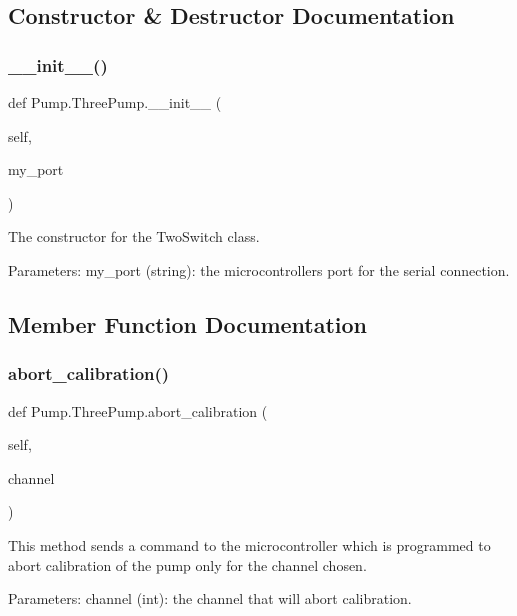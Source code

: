 \subsection{Constructor \& Destructor Documentation}
\mbox{\label{class_pump_1_1_three_pump_a5b920fdc4f8e16fb17dee7ca99586bf9}} 
\subsubsection{\texorpdfstring{\_\_init\_\_()}{\_\_init\_\_()}}
{\footnotesize\ttfamily def Pump.\+Three\+Pump.\+\_\+\+\_\+init\+\_\+\+\_\+ (\begin{DoxyParamCaption}\item[{}]{self,  }\item[{}]{my\+\_\+port }\end{DoxyParamCaption})}

\begin{DoxyVerb}The constructor for the TwoSwitch class.

Parameters:
    my_port (string): the microcontrollers port for the serial connection.
\end{DoxyVerb}
 

\subsection{Member Function Documentation}
\mbox{\label{class_pump_1_1_three_pump_a5981418cc8b62f7e47195cb676f4d5e6}} 
\subsubsection{\texorpdfstring{abort\_calibration()}{abort\_calibration()}}
{\footnotesize\ttfamily def Pump.\+Three\+Pump.\+abort\+\_\+calibration (\begin{DoxyParamCaption}\item[{}]{self,  }\item[{}]{channel }\end{DoxyParamCaption})}

\begin{DoxyVerb}This method sends a command to the microcontroller which is programmed to abort calibration of the pump only for the channel chosen.

Parameters:
    channel (int): the channel that will abort calibration.
\end{DoxyVerb}
 \mbox{\label{class_pump_1_1_three_pump_ab85be09529a117c9f2c8160814c31881}} 
